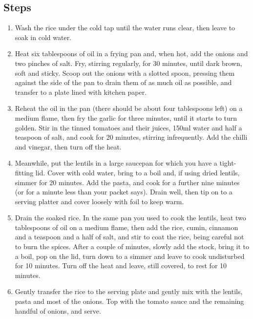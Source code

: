 \documentclass{book}
\begin{document}
\subsection*{Steps}
\begin{enumerate}
\item Wash the rice under the cold tap until the water runs clear, then leave to soak in cold water.
\item Heat six tablespoons of oil in a frying pan and, when hot, add the onions and two pinches of salt. Fry, stirring regularly, for 30 minutes, until dark brown, soft and sticky. Scoop out the onions with a slotted spoon, pressing them against the side of the pan to drain them of as much oil as possible, and transfer to a plate lined with kitchen paper.
\item Reheat the oil in the pan (there should be about four tablespoons left) on a medium flame, then fry the garlic for three minutes, until it starts to turn golden. Stir in the tinned tomatoes and their juices, 150ml water and half a teaspoon of salt, and cook for 20 minutes, stirring infrequently. Add the chilli and vinegar, then turn off the heat.
\item Meanwhile, put the lentils in a large saucepan for which you have a tight-fitting lid. Cover with cold water, bring to a boil and, if using dried lentils, simmer for 20 minutes. Add the pasta, and cook for a further nine minutes (or for a minute less than your packet says). Drain well, then tip on to a serving platter and cover loosely with foil to keep warm.
\item Drain the soaked rice. In the same pan you used to cook the lentils, heat two tablespoons of oil on a medium flame, then add the rice, cumin, cinnamon and a teaspoon and a half of salt, and stir to coat the rice, being careful not to burn the spices. After a couple of minutes, slowly add the stock, bring it to a boil, pop on the lid, turn down to a simmer and leave to cook undisturbed for 10 minutes. Turn off the heat and leave, still covered, to rest for 10 minutes.
\item Gently transfer the rice to the serving plate and gently mix with the lentils, pasta and most of the onions. Top with the tomato sauce and the remaining handful of onions, and serve.
\end{enumerate}
\newpage
\end{document}
